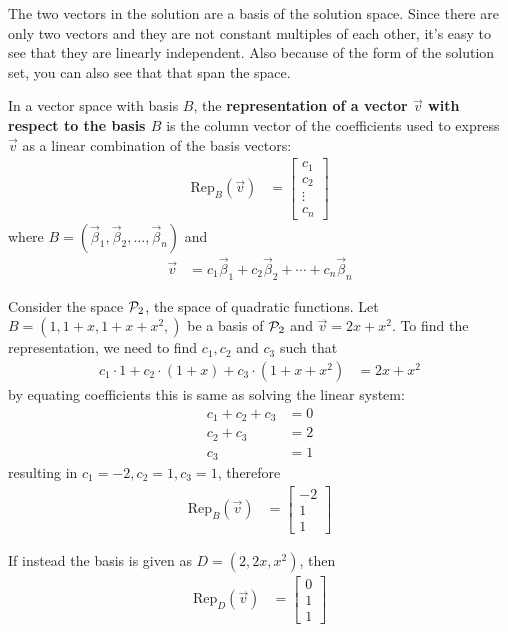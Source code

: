 The two vectors in the solution are a basis of the solution space.  Since there are only two vectors and they are not constant multiples of each other, it's easy to see that they are linearly independent.  Also because of the form of the solution set, you can also see that that span the space.  

\begin{definition}
In a vector space with basis $B$, the \textbf{representation of a vector $\vec{v}$ with respect to the basis $B$} is the column vector of the coefficients used to express $\vec{v}$ as a linear combination of the basis vectors:
%
\begin{align*}
\text{Rep}_B (\vec{v}) & = \begin{bmatrix}
c_1 \\ c_2 \\ \vdots \\ c_n 
\end{bmatrix}
\end{align*}
where $B=( \vec{\beta}_1, \vec{\beta}_2, \ldots , \vec{\beta}_n )$ and
%
\begin{align*}
\vec{v} & = c_1 \vec{\beta}_1 + c_2 \vec{\beta}_2 + \cdots + c_n \vec{\beta}_n
\end{align*}
\end{definition}

\begin{example}
Consider the space ${\cal P}_2$, the space of quadratic functions.  Let $B=( 1, 1+x,1+x+x^2, )$ be a basis of ${\cal P}_2$ and $\vec{v} = 2x+x^2$.  To find the representation, we need to find $c_1, c_2$ and $c_3$ such that
%
\begin{align*}
c_1 \cdot 1 + c_2 \cdot (1+x) + c_3 \cdot (1+x+x^2) & = 2x+x^2
\end{align*}
by equating coefficients this is same as solving the linear system:
%
\begin{align*}
c_1 + c_2 + c_3 & = 0 \\
c_2 + c_3 & = 2 \\
c_3  & = 1
\end{align*}
resulting in $c_1=-2, c_2=1, c_3=1$, therefore
%
\begin{align*}
\text{Rep}_B (\vec{v}) & = \begin{bmatrix}
-2 \\ 1 \\ 1
\end{bmatrix}
\end{align*}

If instead the basis is given as $D=( 2,2x,x^2 )$, then 
%
\begin{align*}
\text{Rep}_D (\vec{v})& = \begin{bmatrix}
0 \\ 1 \\ 1
\end{bmatrix}
\end{align*}
\end{example}


